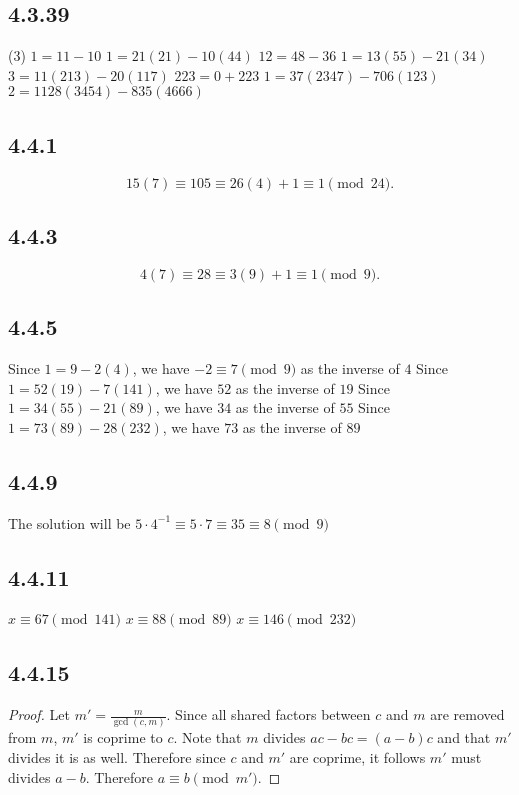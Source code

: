 \documentclass[12pt,titlepage]{extarticle}
\begin{document}
\subsection*{4.3.39}
\begin{tasks}(3)
    \task $1 = 11 - 10$
    \task $1 = 21(21) - 10(44)$
    \task $12 = 48 - 36$
    \task $1 = 13(55) - 21(34)$
    \task $3 = 11(213) - 20(117)$
    \task $223 = 0 + 223$
    \task $1 = 37(2347) - 706(123)$
    \task $2 = 1128(3454) - 835(4666)$
\end{tasks}

\subsection*{4.4.1}
\[
    15(7) \equiv 105 \equiv 26(4) + 1 \equiv 1 \pmod{24}
.\]

\subsection*{4.4.3}
\[
    4(7) \equiv 28 \equiv 3(9) + 1 \equiv 1 \pmod{9}
.\]

\subsection*{4.4.5}
\begin{tasks}
    \task Since $1 = 9 - 2(4)$, we have $-2 \equiv 7 \pmod{9}$ as the inverse of $4$
    \task Since $1 = 52(19) - 7(141)$, we have $52$ as the inverse of $19$
    \task Since $1 = 34(55) - 21(89)$, we have $34$ as the inverse of $55$
    \task Since $1 = 73(89) - 28(232)$, we have $73$ as the inverse of $89$
\end{tasks}

\subsection*{4.4.9}
The solution will be $5 \cdot 4^{-1} \equiv 5 \cdot 7 \equiv 35 \equiv 8 \pmod{9}$

\subsection*{4.4.11}
\begin{tasks}
    \task $x \equiv 67 \pmod{141}$
    \task $x \equiv 88 \pmod{89}$
    \task $x \equiv 146 \pmod{232}$
\end{tasks}

\subsection*{4.4.15}
\begin{proof}
    Let $m' = \frac{m}{\gcd(c,m)}$. Since all shared factors between $c$ and $m$ are removed from $m$, $m'$ is coprime to $c$. Note that $m$ divides $ac - bc = (a-b)c$ and that $m'$ divides it is as well. Therefore since $c$ and $m'$ are coprime, it follows $m'$ must divides $a - b$. Therefore $a \equiv b \pmod{m'}$.
\end{proof}
\end{document}
